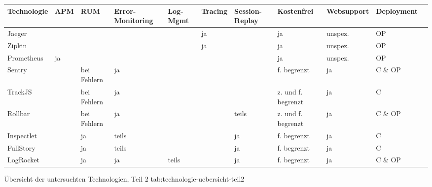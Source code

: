 %
{
\begin{tabular}{|p{2.25cm}|p{1.1cm}|p{1.4cm}|p{1.5cm}|p{1.1cm}|p{1.25cm}|p{1.25cm}|p{1.5cm}|p{1.25cm}|p{1.25cm}|p{1.35cm}|}
\hline
Technologie & APM & RUM & Error-Mo\-ni\-tor\-ing & Log-Mgmt & Tracing & Session-Replay & Kosten\-frei & Web\-support & Deploy\-ment \\
\hline
Jaeger &  &  &  &  & ja &  & ja & unspez. & OP \\
\hline
Zipkin &  &  &  &  & ja &  & ja & unspez. & OP \\
\hline
Prometheus & ja &  &  &  &  &  & ja & unspez. & OP \\
\hline
\hline
Sentry &  & bei \mbox{Fehlern} & ja &  &  &  & f. begrenzt & ja & C \& OP \\
\hline
TrackJS &  & bei \mbox{Fehlern} & ja &  &  &  & z. und f. begrenzt & ja & C \\
\hline
Rollbar &  & bei \mbox{Fehlern} & ja &  &  & teils & z. und f. begrenzt & ja & C \& OP \\
\hline
\hline
Inspectlet &  & ja & teils &  &  & ja & f. begrenzt & ja & C \\
\hline
FullStory &  & ja & teils &  &  & ja & f. begrenzt & ja & C \\
\hline
LogRocket &  & ja & ja & teils &  & ja & f. begrenzt & ja & C \& OP \\
\hline
\end{tabular}
}
{Übersicht der untersuchten Technologien, Teil 2}
{tab:technologie-uebersicht-teil2}